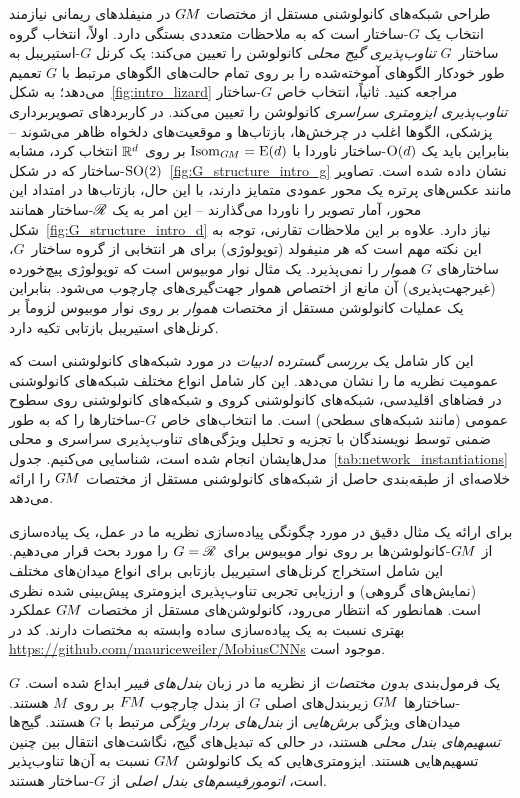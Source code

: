 طراحی شبکه‌های کانولوشنی مستقل از مختصات $G\mkern-1.4muM$ در منیفلدهای ریمانی نیازمند انتخاب یک $G$-ساختار است که به ملاحظات متعددی بستگی دارد.
اولاً، انتخاب گروه ساختار~$G$ \emph{تناوب‌پذیری گیج محلی} کانولوشن را تعیین می‌کند:
یک کرنل $G$-استیریبل به طور خودکار الگوهای آموخته‌شده را بر روی تمام حالت‌های الگوهای مرتبط با $G$ تعمیم می‌دهد؛ به شکل~\ref{fig:intro_lizard} مراجعه کنید.
ثانیاً، انتخاب خاص $G$-ساختار \emph{تناوب‌پذیری ایزومتری سراسری} کانولوشن را تعیین می‌کند.
در کاربردهای تصویربرداری پزشکی، الگوها اغلب در چرخش‌ها، بازتاب‌ها و موقعیت‌های دلخواه ظاهر می‌شوند
-- بنابراین باید یک $\operatorname{O}(d)$-ساختار ناوردا با $\operatorname{Isom}_{G\mkern-1.4muM} = \operatorname{E}(d)$ بر روی $\mathbb{R}^d$ انتخاب کرد، مشابه $\operatorname{SO}(2)$-ساختار که در شکل~\ref{fig:G_structure_intro_g} نشان داده شده است.
تصاویر مانند عکس‌های پرتره یک محور عمودی متمایز دارند، با این حال، بازتاب‌ها در امتداد این محور، آمار تصویر را ناوردا می‌گذارند
-- این امر به یک $\mathscr{R}$-ساختار همانند شکل~\ref{fig:G_structure_intro_d} نیاز دارد.
علاوه بر این ملاحظات تقارنی، توجه به این نکته مهم است که هر منیفولد (توپولوژی) برای هر انتخابی از گروه ساختار~$G$، ساختارهای $G$ \emph{هموار} را نمی‌پذیرد.
یک مثال نوار موبیوس است که توپولوژی پیچ‌خورده (غیرجهت‌پذیری) آن مانع از اختصاص هموار جهت‌گیری‌های چارچوب می‌شود.
بنابراین یک عملیات کانولوشن مستقل از مختصات \emph{هموار} بر روی نوار موبیوس لزوماً بر کرنل‌های استیریبل بازتابی تکیه دارد.


این کار شامل یک \emph{بررسی گسترده ادبیات} در مورد شبکه‌های کانولوشنی است که عمومیت نظریه ما را نشان می‌دهد.
این کار شامل انواع مختلف شبکه‌های کانولوشنی در فضاهای اقلیدسی، شبکه‌های کانولوشنی کروی و شبکه‌های کانولوشنی روی سطوح عمومی (مانند شبکه‌های سطحی) است.
ما انتخاب‌های خاص $G$-ساختارها را که به طور ضمنی توسط نویسندگان با تجزیه و تحلیل ویژگی‌های تناوب‌پذیری سراسری و محلی مدل‌هایشان انجام شده است، شناسایی می‌کنیم.
جدول~\ref{tab:network_instantiations} خلاصه‌ای از طبقه‌بندی حاصل از شبکه‌های کانولوشنی مستقل از مختصات $G\mkern-1.4muM$ را ارائه می‌دهد.


برای ارائه یک مثال دقیق در مورد چگونگی پیاده‌سازی نظریه ما در عمل، یک پیاده‌سازی از $G\mkern-1.4muM$-کانولوشن‌ها بر روی نوار موبیوس برای~$G=\mathscr{R}$ را مورد بحث قرار می‌دهیم.
این شامل استخراج کرنل‌های استیریبل بازتابی برای انواع میدان‌های مختلف (نمایش‌های گروهی) و ارزیابی تجربی تناوب‌پذیری ایزومتری پیش‌بینی شده نظری است.
همانطور که انتظار می‌رود، کانولوشن‌های مستقل از مختصات $G\mkern-1.4muM$ عملکرد بهتری نسبت به یک پیاده‌سازی ساده وابسته به مختصات دارند.
کد در \url{https://github.com/mauriceweiler/MobiusCNNs} موجود است.

یک فرمول‌بندی \emph{بدون مختصات} از نظریه ما در زبان \emph{بندل‌های فیبر} ابداع شده است.
$G$-ساختارها $G\mkern-1.4muM$ زیربندل‌های اصلی $G$ از بندل چارچوب $F\mkern-1.5muM$ بر روی~$M$ هستند.
میدان‌های ویژگی \emph{برش‌هایی} از \emph{بندل‌های بردار ویژگی} مرتبط با $G$ هستند.
گیج‌ها \emph{تسهیم‌های بندل محلی} هستند، در حالی که تبدیل‌های گیج، نگاشت‌های انتقال بین چنین تسهیم‌هایی هستند.
ایزومتری‌هایی که یک کانولوشن $G\mkern-1.4muM$ نسبت به آن‌ها تناوب‌پذیر است، \emph{اتومورفیسم‌های بندل اصلی} از $G$-ساختار هستند.


